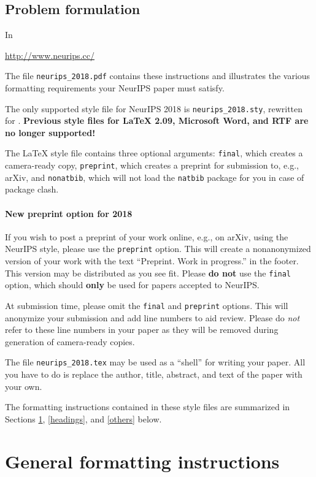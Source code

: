 \documentclass{article}
\begin{document}
\subsection{Problem formulation}
In 

\begin{center}
  \url{http://www.neurips.cc/}
\end{center}
The file \verb+neurips_2018.pdf+ contains these instructions and illustrates the
various formatting requirements your NeurIPS paper must satisfy.

The only supported style file for NeurIPS 2018 is \verb+neurips_2018.sty+,
rewritten for \LaTeXe{}.  \textbf{Previous style files for \LaTeX{} 2.09,
  Microsoft Word, and RTF are no longer supported!}

The \LaTeX{} style file contains three optional arguments: \verb+final+, which
creates a camera-ready copy, \verb+preprint+, which creates a preprint for
submission to, e.g., arXiv, and \verb+nonatbib+, which will not load the
\verb+natbib+ package for you in case of package clash.

\paragraph{New preprint option for 2018}
If you wish to post a preprint of your work online, e.g., on arXiv, using the
NeurIPS style, please use the \verb+preprint+ option. This will create a
nonanonymized version of your work with the text ``Preprint. Work in progress.''
in the footer. This version may be distributed as you see fit. Please \textbf{do
  not} use the \verb+final+ option, which should \textbf{only} be used for
papers accepted to NeurIPS.

At submission time, please omit the \verb+final+ and \verb+preprint+
options. This will anonymize your submission and add line numbers to aid
review. Please do \emph{not} refer to these line numbers in your paper as they
will be removed during generation of camera-ready copies.

The file \verb+neurips_2018.tex+ may be used as a ``shell'' for writing your
paper. All you have to do is replace the author, title, abstract, and text of
the paper with your own.

The formatting instructions contained in these style files are summarized in
Sections \ref{gen_inst}, \ref{headings}, and \ref{others} below.

\section{General formatting instructions}
\label{gen_inst}
\end{document}
